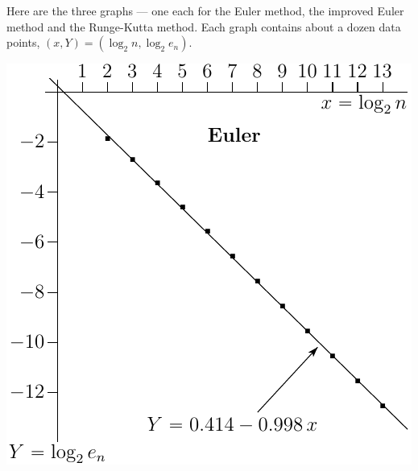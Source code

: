 Here are the three graphs --- one each for the Euler method, the improved 
Euler method and the Runge-Kutta method.
Each graph contains about a dozen  data points, $(x, Y)=(\log_2n, \log_2e_n)$.

\begin{efig}
\begin{center}
    \includegraphics[scale=0.95]{euler_error.pdf}
\end{center}
\end{efig}

